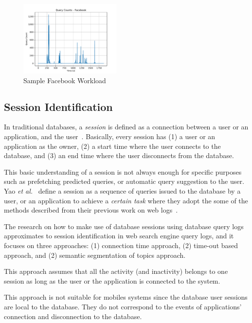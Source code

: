 \begin{figure}[h!]
    \centering
    \includegraphics[width=0.45\textwidth]{graphics/ChangeOverTimeData}
    \caption{Sample Facebook Workload}
    \label{fig:sampleFacebook}
\end{figure}

\subsection{Session Identification}
\label{sec:backgroundSessionIdentification}
In traditional databases, a \textit{session} is defined as a connection between a user or an application, and the user~\cite{oracle9i}. Basically, every session has (1) a user or an application as the owner, (2) a start time where the user connects to the database, and (3) an end time where the user disconnects from the database.

This basic understanding of a session is not always enough for specific purposes such as prefetching predicted queries, or automatic query suggestion to the user. Yao \textit{et al.}~\cite{huang2006} define a session as a sequence of queries issued to the database by a user, or an application to achieve a \emph{certain task} where they adopt the some of the methods described from their previous work on web logs~\cite{huang2004dynamic}. 

The research on how to make use of database sessions using database query logs approximates to session identification in web search engine query logs, and it focuses on three approaches: (1) connection time approach, (2) time-out based approach, and (2) semantic segmentation of topics approach.

 This approach assumes that all the activity (and inactivity) belongs to one session as long as the user or the application is connected to the system. 

This approach is not suitable for mobiles systems since the database user sessions are local to the database. They do not correspond to the events of applications' connection and disconnection to the database.

